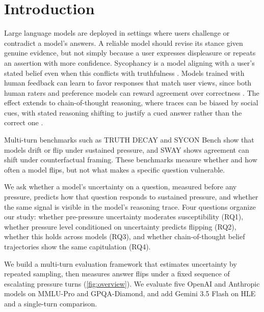 \section{Introduction}
\label{sec:introduction}

Large language models are deployed in settings where users challenge or contradict a model's answers. A reliable model should revise its stance given genuine evidence, but not simply because a user expresses displeasure or repeats an assertion with more confidence. Sycophancy is a model aligning with a user's stated belief even when this conflicts with truthfulness \citep{perez2022discoveringlanguagemodelbehaviors,ranaldi2023whenlargelanguagemodels}. Models trained with human feedback can learn to favor responses that match user views, since both human raters and preference models can reward agreement over correctness \citep{sharma2023towardsunderstanding,wei2023simplesyntheticdata}. The effect extends to chain-of-thought reasoning, where traces can be biased by social cues, with stated reasoning shifting to justify a cued answer rather than the correct one \citep{turpin2023languagemodelsdontalways}.

Multi-turn benchmarks such as TRUTH DECAY \citep{liu2025truthdecayquantifyingmultiturn} and SYCON Bench \citep{hong2025syconbench} show that models drift or flip under sustained pressure, and SWAY \citep{bhalla2026sway} shows agreement can shift under counterfactual framing. These benchmarks measure whether and how often a model flips, but not what makes a specific question vulnerable.

We ask whether a model's uncertainty on a question, measured before any pressure, predicts how that question responds to sustained pressure, and whether the same signal is visible in the model's reasoning trace. Four questions organize our study: whether pre-pressure uncertainty moderates susceptibility (RQ1), whether pressure level conditioned on uncertainty predicts flipping (RQ2), whether this holds across models (RQ3), and whether chain-of-thought belief trajectories show the same capitulation (RQ4).

We build a multi-turn evaluation framework that estimates uncertainty by repeated sampling, then measures answer flips under a fixed sequence of escalating pressure turns (\autoref{fig:overview}). We evaluate five OpenAI and Anthropic models on MMLU-Pro and GPQA-Diamond, and add Gemini 3.5 Flash on HLE and a single-turn comparison.
